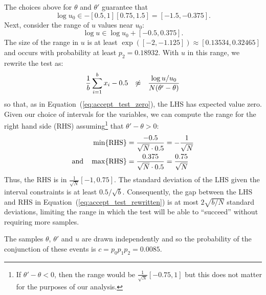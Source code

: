 \documentclass[twoside]{article} \usepackage{aistats2017}
\begin{document}
The choices above for $\theta$ and $\theta'$ guarantee that
\begin{equation}\label{eq:log_uo_range}
    \log u_0 \in -[0.5,1][0.75,1.5] = [-1.5, -0.375].
\end{equation}
Next, consider the range of $u$ values near $u_0$:
\begin{equation}\label{eq:log_u_range}
    \log u \in \log u_0 + [-0.5,0.375].
\end{equation}
The size of the range in $u$ is at least $\exp([-2,-1.125]) \approx
[0.13534,0.32465]$ and occurs with probability at least $p_2=0.18932$. With $u$
in this range, we rewrite the test as:
\begin{equation}\label{eq:accept_test_rewritten}
    \frac{1}{b}\sum_{i=1}^b x_i-0.5 \hspace{0.1in} \not\approx \hspace{0.1in} \frac{\log u/u_0}{N(\theta'-\theta)}
\end{equation}
so that, as in Equation~(\ref{eq:accept_test_zero}), the LHS has expected value
zero.  Given our choice of intervals for the variables, we can compute the range
for the right hand side (RHS) assuming\footnote{If $\theta'-\theta<0$, then the
range would be $\frac{1}{\sqrt{N}}[-0.75,1]$ but this does not matter for
the purposes of our analysis.} that $\theta'-\theta > 0$:
\begin{equation}\label{eq:rhs_range}
\begin{split}
    \min\{{\rm RHS}\} & = \frac{-0.5}{\sqrt{N} \cdot 0.5} = -\frac{1}{\sqrt{N}} \\
    {\rm and} \quad \max\{{\rm RHS}\} & = \frac{0.375}{\sqrt{N} \cdot 0.5} = \frac{0.75}{\sqrt{N}}
\end{split}
\end{equation}
Thus, the RHS is in $\frac{1}{\sqrt{N}}[-1,0.75]$.  The standard deviation of
the LHS given the interval constraints is at least $0.5/\sqrt{b}$.
Consequently, the gap between the LHS and RHS in
Equation~(\ref{eq:accept_test_rewritten}) is at most $2\sqrt{b/N}$ standard
deviations, limiting the range in which the test will be able to ``succeed''
without requiring more samples.

The samples $\theta$, $\theta'$ and $u$ are drawn independently and so the
probability of the conjunction of these events is $c = p_0 p_1 p_2 = 0.0085$.
\end{document}
